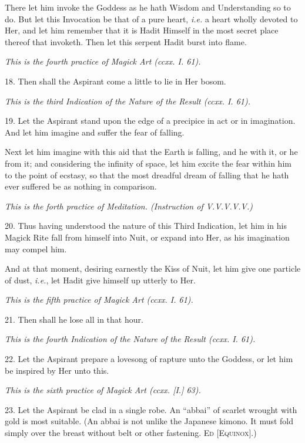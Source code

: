 There let him invoke the Goddess as he hath Wisdom and Understanding so to do. But let this Invocation be that of a pure heart, \textit{i.e.} a heart wholly devoted to Her, and let him remember that it is Hadit Himself in the most secret place thereof that invoketh. Then let this serpent Hadit burst into flame.

\textit{This is the fourth practice of Magick Art (ccxx. I. 61).}

18. Then shall the Aspirant come a little to lie in Her bosom.

\textit{This is the third Indication of the Nature of the Result (ccxx. I. 61).}

19. Let the Aspirant stand upon the edge of a precipice in act or in imagination. And let him imagine and suffer the fear of falling.

Next let him imagine with this aid that the Earth is falling, and he with it, or he from it; and considering the infinity of space, let him excite the fear within him to the point of ecstasy, so that the most dreadful dream of falling that he hath ever suffered be as nothing in comparison.

\textit{This is the forth practice of Meditation. (Instruction of V.V.V.V.V.)}

20. Thus having understood the nature of this Third Indication, let him in his Magick Rite fall from himself into Nuit, or expand into Her, as his imagination may compel him.

And at that moment, desiring earnestly the Kiss of Nuit, let him give one particle of dust, \textit{i.e.}, let Hadit give himself up utterly to Her.

\textit{This is the fifth practice of Magick Art (ccxx. I. 61).}

21. Then shall he lose all in that hour.

\textit{This is the fourth Indication of the Nature of the Result (ccxx. I. 61).}

22. Let the Aspirant prepare a lovesong of rapture unto the Goddess, or let him be inspired by Her unto this.

\textit{This is the sixth practice of Magick Art (ccxx. [I.] 63).}

23. Let the Aspirant be clad in a single robe. An \enquote{abbai} of scarlet wrought with gold is most suitable. (An abbai is not unlike the Japanese kimono. It must fold simply over the breast without belt or other fastening. \textsc{Ed [Equinox]}.)

